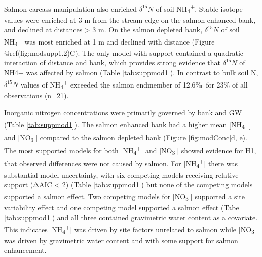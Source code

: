 \documentclass [11pt, proquest] {uwthesis}[2015/03/03]
\begin{document}
Salmon carcass manipulation also enriched \(\delta^{15}N\) of soil
NH\textsubscript{4}\textsuperscript{+}. Stable isotope values were
enriched at 3 m from the stream edge on the salmon enhanced bank, and
declined at distances \textgreater{} 3 m. On the salmon depleted bank,
\(\delta^{15}N\) of soil NH\textsubscript{4}\textsuperscript{+} was most
enriched at 1 m and declined with distance (Figure
@ref(fig:modsupp1.2)C). The only model with support contained a
quadratic interaction of distance and bank, which provides strong
evidence that \(\delta^{15}N\) of NH4+ was affected by salmon (Table
\ref{tab:suppmod1}). In contrast to bulk soil N, \(\delta^{15}N\) values
of NH\textsubscript{4}\textsuperscript{+} exceeded the salmon endmember
of 12.6‰ for 23\% of all observations (n=21).

Inorganic nitrogen concentrations were primarily governed by bank and GW
(Table \ref{tab:suppmod1}). The salmon enhanced bank had a higher mean
{[}NH\textsubscript{4}\textsuperscript{+}{]} and
{[}NO\textsubscript{3}\textsuperscript{-}{]} compared to the salmon
depleted bank (Figure \ref{fig:modConc}d, e). The most supported models
for both {[}NH\textsubscript{4}\textsuperscript{+}{]} and
{[}NO\textsubscript{3}\textsuperscript{-}{]} showed evidence for H1,
that observed differences were not caused by salmon. For
{[}NH\textsubscript{4}\textsuperscript{+}{]} there was substantial model
uncertainty, with six competing models receiving relative support (ΔAIC
\textless{} 2) (Table \ref{tab:suppmod1}) but none of the competing
models supported a salmon effect. Two competing models for
{[}NO\textsubscript{3}\textsuperscript{-}{]} supported a site
variability effect and one competing model supported a salmon effect
(Tabe \ref{tab:suppmod1}) and all three contained gravimetric water
content as a covariate. This indicates
{[}NH\textsubscript{4}\textsuperscript{+}{]} was driven by site factors
unrelated to salmon while {[}NO\textsubscript{3}\textsuperscript{-}{]}
was driven by gravimetric water content and with some support for salmon
enhancement.
\end{document}
